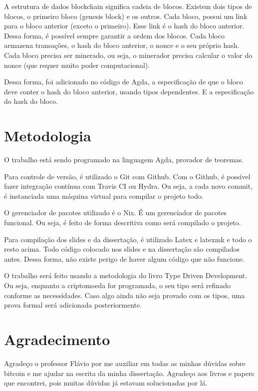 \documentclass[12pt]{report}
\begin{document}
A estrutura de dados blockchain significa cadeia de blocos. Existem dois tipos de blocos, o primeiro bloco (genesis block) e os outros. Cada bloco, possui um link para o bloco anterior (exceto o primeiro). Esse link é o hash do bloco anterior. Dessa forma, é possível sempre garantir a ordem dos blocos. Cada bloco armazena transações, o hash do bloco anterior, o nonce e o seu próprio hash. Cada bloco precisa ser minerado, ou seja, o minerador precisa calcular o valor do nonce (que requer muito poder computacional).

Dessa forma, foi adicionado no código de Agda, a especificação de que o bloco deve conter o hash do bloco anterior, usando tipos dependentes. E a especificação do hash do bloco.


\section{Metodologia}

O trabalho está sendo programado na linguagem Agda, provador de teoremas. 

Para controle de versão, é utilizado o Git com Github.
Com o Github, é possível fazer integração contínua com Travis CI ou Hydra.
Ou seja, a cada novo commit, é instanciada uma máquina virtual para compilar o projeto todo.

O gerenciador de pacotes utilizado é o Nix. É um gerenciador de pacotes funcional. 
Ou seja, é feito de forma descritiva como será compilado o projeto.

Para compilação dos slides e da dissertação, é utilizado Latex e latexmk e todo o resto acima.
Todo código colocado nos slides e na dissertação são compilados antes. Dessa forma, não existe perigo de haver algum código que não funcione.

O trabalho será feito usando a metodologia do livro Type Driven Development. Ou seja, enquanto a criptomoeda for programada, o seu tipo será refinado conforme as necessidades. Caso algo ainda não seja provado com os tipos, uma prova formal será adicionada posteriormente.

\newpage
\section{Agradecimento}

Agradeço o professor Flávio por me auxiliar em todas as minhas dúvidas sobre bitcoin e me ajudar na escrita da minha dissertação. 
Agradeço aos livros e papers que encontrei, pois muitas dúvidas já estavam solucionadas por lá.
\end{document}
